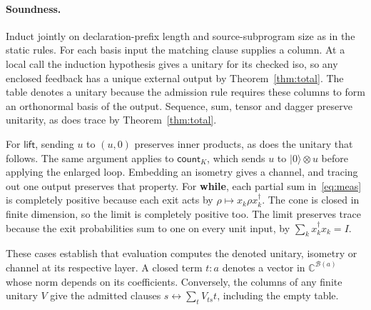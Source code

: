 \documentclass[acmsmall,screen,review,anonymous,nonacm]{acmart}
\newcommand{\storyinlinekwface}{\storyinlineface\bfseries}}
\newcommand{\storyinlineface}{\small\ttfamily}
\newcommand{\storyinlinekwface}{\small\ttfamily\bfseries}
\newcommand{\kw}[1]{\textnormal{\storyinlinekwface #1}}
\newcommand{\ket}[1]{\lvert #1\rangle}
\numberwithin{equation}{section}
\begin{document}
\paragraph{Soundness.}
Induct jointly on declaration-prefix length and source-subprogram size as in the
static rules. For each basis input the matching clause supplies a column. At a local
call the induction hypothesis gives a unitary for its checked iso, so any enclosed
feedback has a unique external output by Theorem~\ref{thm:total}. The table denotes a unitary
because the admission rule requires these columns to form an orthonormal
basis of the output. Sequence, sum, tensor and dagger preserve unitarity,
as does trace by Theorem~\ref{thm:total}.

For $\mathsf{lift}$, sending $u$ to $(u,0)$ preserves inner products,
as does the unitary that follows. The same argument applies to
$\mathsf{count}_K$, which sends $u$ to $\ket0\otimes u$ before applying
the enlarged loop. Embedding an isometry gives a channel, and tracing
out one output preserves that property.
For \kw{while}, each partial sum in~\eqref{eq:meas} is completely positive
because each exit acts by $\rho\mapsto x_k\rho x_k^\dagger$. The cone is
closed in finite dimension, so the limit is completely positive too.
The limit preserves trace because the exit probabilities sum to one on every unit input, by $\sum_k x_k^\dagger x_k=I$.

These cases establish that evaluation computes the denoted unitary,
isometry or channel at its respective layer. A closed term $t:a$ denotes a
vector in $\mathbb C^{\mathcal B(a)}$ whose norm depends on its coefficients.
Conversely, the columns of any finite unitary $V$ give the admitted clauses
$s\leftrightarrow\sum_t V_{ts}t$, including the empty table.
\end{document}
